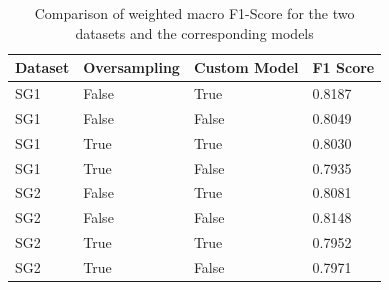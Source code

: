 \documentclass[11pt,a4paper]{article}
\begin{document}
\begin{table}[h]
\small
\centering
\caption{Comparison of weighted macro F1-Score for the two datasets and the corresponding models}
\label{tab:f1_SG_datasets}
\begin{tabular}{llll}
\hline
\multicolumn{1}{|l|}{\textbf{Dataset}} & \multicolumn{1}{l|}{\textbf{Oversampling}} & \multicolumn{1}{l|}{\textbf{Custom Model}} & \multicolumn{1}{l|}{\textbf{F1 Score}} \\ \hline
SG1                                    & False                                      & True                                       & 0.8187                                 \\
SG1                                    & False                                      & False                                      & 0.8049                                 \\
SG1                                    & True                                       & True                                       & 0.8030                                 \\
SG1                                    & True                                       & False                                      & 0.7935                                 \\
SG2                                    & False                                      & True                                       & 0.8081                                 \\
SG2                                    & False                                      & False                                      & 0.8148                                 \\
SG2                                    & True                                       & True                                       & 0.7952                                 \\
SG2                                    & True                                       & False                                      & 0.7971                                
\end{tabular}
\end{table}
\end{document}
